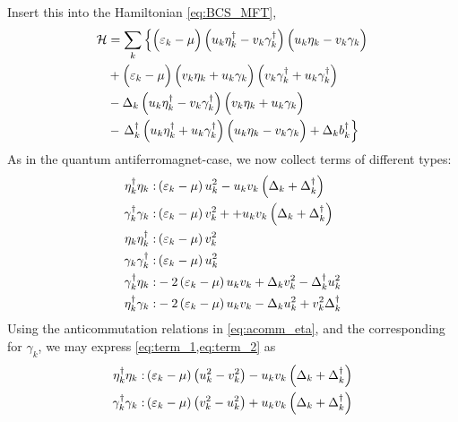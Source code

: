 Insert this into the Hamiltonian \cref{eq:BCS_MFT},
\begin{align}
	\begin{split}
	\mathcal{H} &= \sum_k\left\{\left(\vphantom{\eta_k^\dagger}\varepsilon_k-\mu\right)\left(u_k\eta_k^\dagger-v_k\gamma_k^\dagger\right)\left(\vphantom{\eta_k^\dagger}u_k\eta_k-v_k\gamma_k\right)\right. \\ 
	&+\left(\vphantom{\eta_k^\dagger}\varepsilon_k-\mu\right)\left(\vphantom{\eta_k^\dagger}v_k\eta_k + u_k\gamma_k\right)\left(v_k\gamma_k^\dagger + u_k\gamma_k^\dagger\right) \\
	&-\Delta_k\left(u_k\eta_k^\dagger -v_k\gamma_k^\dagger\right)\left(\vphantom{\eta_k^\dagger}v_k\eta_k + u_k\gamma_k \right)\\
	&-\left. \Delta_k^\dagger\left(u_k\eta_k^\dagger + u_k\gamma_k^\dagger\right)\left(\vphantom{\eta_k^\dagger}u_k\eta_k-v_k\gamma_k\right) +\Delta_k b_k^\dagger \vphantom{\left(\eta_k^\dagger\right.} \right\}
	\end{split}
\end{align}
As in the quantum antiferromagnet-case, we now collect terms of different types:
\begin{subequations}
\begin{align}
	\eta_k^\dagger\eta_k :& \left(\varepsilon_k-\mu\right)u_k^2 - u_kv_k\left(\Delta_k+\Delta_k^\dagger\right)\label{eq:term_1} \\
	\gamma_k^\dagger\gamma_k :& \left(\varepsilon_k - \mu\right)v_k^2 + +u_kv_k\left(\Delta_k + \Delta_k^\dagger\right) \label{eq:term_2}\\
	\eta_k\eta_k^\dagger :&  \left(\varepsilon_k-\mu\right)v_k^2 \\
	\gamma_k\gamma_k^\dagger:& \left(\varepsilon_k-\mu\right)u_k^2 \\
	\gamma_k^\dagger\eta_k :&-2\left(\varepsilon_k-\mu\right)u_kv_k + \Delta_k v_k^2- \Delta_k^\dagger u_k^2\label{eq:term_3} \\
	\label{eq:term_4}
	\eta_k^\dagger\gamma_k :& -2\left(\varepsilon_k-\mu\right)u_kv_k - \Delta_k u_k^2 + v_k^2\Delta_k^\dagger 
\end{align}
\end{subequations}
Using the anticommutation relations in \cref{eq:acomm_eta}, and the corresponding for $\gamma_k$, we may express \cref{eq:term_1,eq:term_2} as
\begin{subequations}
	\begin{align}
		\eta_k^\dagger\eta_k :& \left(\varepsilon_k-\mu\right)\left(u_k^2-v_k^2\right)-u_kv_k\left(\Delta_k+\Delta_k^\dagger\right) \\
		\gamma_k^\dagger\gamma_k :& \left(\varepsilon_k - \mu\right)\left(v_k^2-u_k^2\right)  +u_kv_k\left(\Delta_k + \Delta_k^\dagger\right) 
	\end{align}
\end{subequations}
